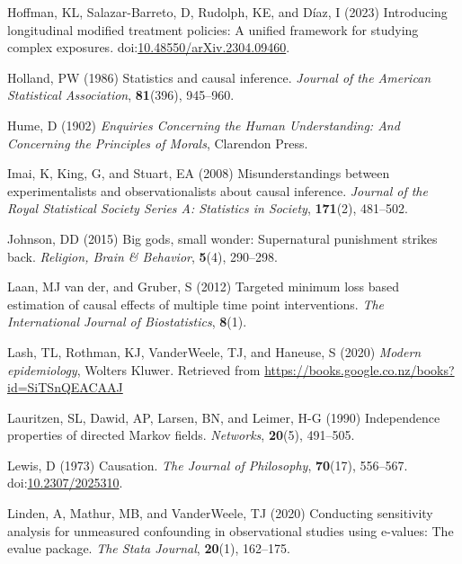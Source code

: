 \documentclass[
  single column]{article}
\newlength{\cslhangindent}
\newenvironment{CSLReferences}[2] %
 {\begin{list}{}{%
  \setlength{\itemindent}{0pt}
  \setlength{\leftmargin}{0pt}
  \setlength{\parsep}{0pt}
  \ifodd #1
   \setlength{\leftmargin}{\cslhangindent}
   \setlength{\itemindent}{-1\cslhangindent}
  \fi
  \setlength{\itemsep}{#2\baselineskip}}}
 {\end{list}}
\begin{document}
\begin{CSLReferences}{1}{0}
Hoffman, KL, Salazar-Barreto, D, Rudolph, KE, and Díaz, I (2023)
Introducing longitudinal modified treatment policies: A unified
framework for studying complex exposures.
doi:\href{https://doi.org/10.48550/arXiv.2304.09460}{10.48550/arXiv.2304.09460}.

Holland, PW (1986) Statistics and causal inference. \emph{Journal of the
American Statistical Association}, \textbf{81}(396), 945--960.

Hume, D (1902) \emph{Enquiries Concerning the Human Understanding: And
Concerning the Principles of Morals}, Clarendon Press.

Imai, K, King, G, and Stuart, EA (2008) Misunderstandings between
experimentalists and observationalists about causal inference.
\emph{Journal of the Royal Statistical Society Series A: Statistics in
Society}, \textbf{171}(2), 481--502.

Johnson, DD (2015) Big gods, small wonder: Supernatural punishment
strikes back. \emph{Religion, Brain \& Behavior}, \textbf{5}(4),
290--298.

Laan, MJ van der, and Gruber, S (2012) Targeted minimum loss based
estimation of causal effects of multiple time point interventions.
\emph{The International Journal of Biostatistics}, \textbf{8}(1).

Lash, TL, Rothman, KJ, VanderWeele, TJ, and Haneuse, S (2020)
\emph{Modern epidemiology}, Wolters Kluwer. Retrieved from
\url{https://books.google.co.nz/books?id=SiTSnQEACAAJ}

Lauritzen, SL, Dawid, AP, Larsen, BN, and Leimer, H-G (1990)
Independence properties of directed {M}arkov fields. \emph{Networks},
\textbf{20}(5), 491--505.

Lewis, D (1973) Causation. \emph{The Journal of Philosophy},
\textbf{70}(17), 556--567.
doi:\href{https://doi.org/10.2307/2025310}{10.2307/2025310}.

Linden, A, Mathur, MB, and VanderWeele, TJ (2020) Conducting sensitivity
analysis for unmeasured confounding in observational studies using
e-values: The evalue package. \emph{The Stata Journal}, \textbf{20}(1),
162--175.


\end{CSLReferences}
\end{document}
